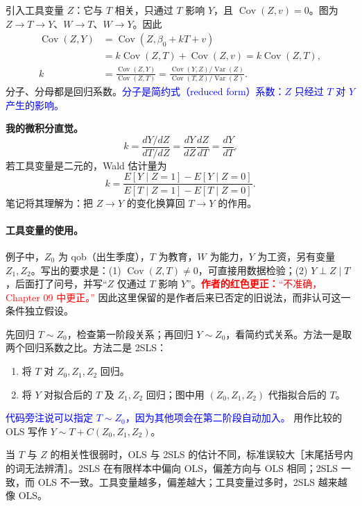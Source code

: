 \documentclass[11pt,a4paper]{article}
\newcommand{\inkblue}[1]{\textcolor{blue}{#1}}
\newcommand{\inkred}[1]{\textcolor{red}{#1}}
\begin{document}
{引入工具变量 $Z$：它与 $T$ 相关，只通过 $T$ 影响 $Y$，且 $\operatorname{Cov}(Z,v)=0$。图为 $Z\to T\to Y$、$W\to T$、$W\to Y$。因此
\begin{align*}
\operatorname{Cov}(Z,Y)&=\operatorname{Cov}(Z,\beta_0+kT+v)\\
&=k\operatorname{Cov}(Z,T)+\operatorname{Cov}(Z,v)=k\operatorname{Cov}(Z,T),\\
k&=\frac{\operatorname{Cov}(Z,Y)}{\operatorname{Cov}(Z,T)}
=\frac{\operatorname{Cov}(Y,Z)/\operatorname{Var}(Z)}{\operatorname{Cov}(T,Z)/\operatorname{Var}(Z)}.
\end{align*}
分子、分母都是回归系数。\inkblue{分子是简约式（reduced form）系数：$Z$ 只经过 $T$ 对 $Y$ 产生的影响。}

\textbf{我的微积分直觉。}
\[k=\frac{dY/dZ}{dT/dZ}=\frac{dY}{dZ}\frac{dZ}{dT}=\frac{dY}{dT}.\]
若工具变量是二元的，Wald 估计量为
\[k=\frac{E[Y\mid Z=1]-E[Y\mid Z=0]}{E[T\mid Z=1]-E[T\mid Z=0]}.\]
笔记将其理解为：把 $Z\to Y$ 的变化换算回 $T\to Y$ 的作用。

\paragraph{工具变量的使用。}
例子中，$Z_0$ 为 qob（出生季度），$T$ 为教育，$W$ 为能力，$Y$ 为工资，另有变量 $Z_1,Z_2$。写出的要求是：(1) $\operatorname{Cov}(Z,T)\ne0$，可直接用数据检验；(2) $Y\perp Z\mid T$，后面打了问号，并写“$Z$ 仅通过 $T$ 影响 $Y$”。\inkred{\textbf{作者的红色更正：}“不准确，Chapter 09 中更正。”} 因此这里保留的是作者后来已否定的旧说法，而非认可这一条件独立假设。

先回归 $T\sim Z_0$，检查第一阶段关系；再回归 $Y\sim Z_0$，看简约式关系。方法一是取两个回归系数之比。方法二是 2SLS：
\begin{enumerate}
\item 将 $T$ 对 $Z_0,Z_1,Z_2$ 回归。
\item 将 $Y$ 对拟合后的 $T$ 及 $Z_1,Z_2$ 回归；图中用 $(Z_0,Z_1,Z_2)$ 代指拟合后的 $T$。
\end{enumerate}
\inkblue{代码旁注说可以指定 $T\sim Z_0$，因为其他项会在第二阶段自动加入。} 用作比较的 OLS 写作 $Y\sim T+C(Z_0,Z_1,Z_2)$。

当 $T$ 与 $Z$ 的相关性很弱时，OLS 与 2SLS 的估计不同，标准误较大［末尾括号内的词无法辨清］。2SLS 在有限样本中偏向 OLS，偏差方向与 OLS 相同；2SLS 一致，而 OLS 不一致。工具变量越多，偏差越大；工具变量过多时，2SLS 越来越像 OLS。

\begin{center}
\begin{tikzpicture}[>=Stealth, font=\small, line width=.65pt]


\end{tikzpicture}
\end{center}}
\end{document}
